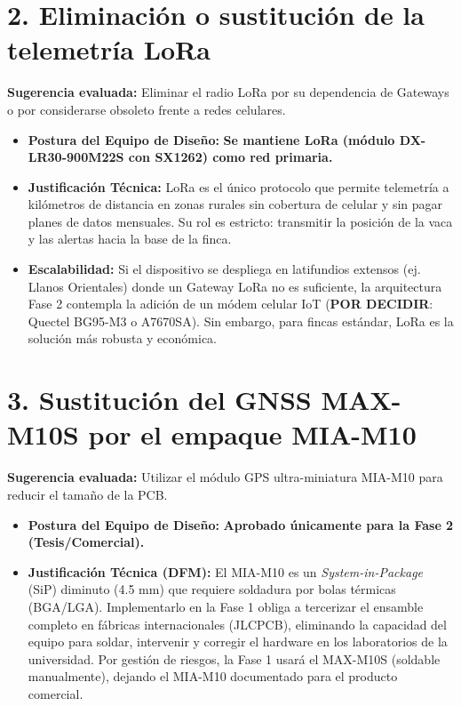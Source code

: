 \documentclass[10pt,letterpaper]{article}
\begin{document}
\section*{2. Eliminación o sustitución de la telemetría LoRa}
\textbf{Sugerencia evaluada:} Eliminar el radio LoRa por su dependencia de Gateways o por considerarse obsoleto frente a redes celulares.
\begin{itemize}[leftmargin=*]
    \item \textbf{Postura del Equipo de Diseño:} \textbf{Se mantiene LoRa (módulo DX-LR30-900M22S con SX1262) como red primaria.}
    \item \textbf{Justificación Técnica:} LoRa es el único protocolo que permite telemetría a kilómetros de distancia en zonas rurales sin cobertura de celular y sin pagar planes de datos mensuales. Su rol es estricto: transmitir la posición de la vaca y las alertas hacia la base de la finca. 
    \item \textbf{Escalabilidad:} Si el dispositivo se despliega en latifundios extensos (ej. Llanos Orientales) donde un Gateway LoRa no es suficiente, la arquitectura Fase 2 contempla la adición de un módem celular IoT (\textbf{POR DECIDIR}: Quectel BG95-M3 o A7670SA). Sin embargo, para fincas estándar, LoRa es la solución más robusta y económica.
\end{itemize}

\section*{3. Sustitución del GNSS MAX-M10S por el empaque MIA-M10}
\textbf{Sugerencia evaluada:} Utilizar el módulo GPS ultra-miniatura MIA-M10 para reducir el tamaño de la PCB.
\begin{itemize}[leftmargin=*]
    \item \textbf{Postura del Equipo de Diseño:} \textbf{Aprobado únicamente para la Fase 2 (Tesis/Comercial).}
    \item \textbf{Justificación Técnica (DFM):} El MIA-M10 es un \emph{System-in-Package} (SiP) diminuto (4.5 mm) que requiere soldadura por bolas térmicas (BGA/LGA). Implementarlo en la Fase 1 obliga a tercerizar el ensamble completo en fábricas internacionales (JLCPCB), eliminando la capacidad del equipo para soldar, intervenir y corregir el hardware en los laboratorios de la universidad. Por gestión de riesgos, la Fase 1 usará el MAX-M10S (soldable manualmente), dejando el MIA-M10 documentado para el producto comercial.
\end{itemize}
\end{document}
